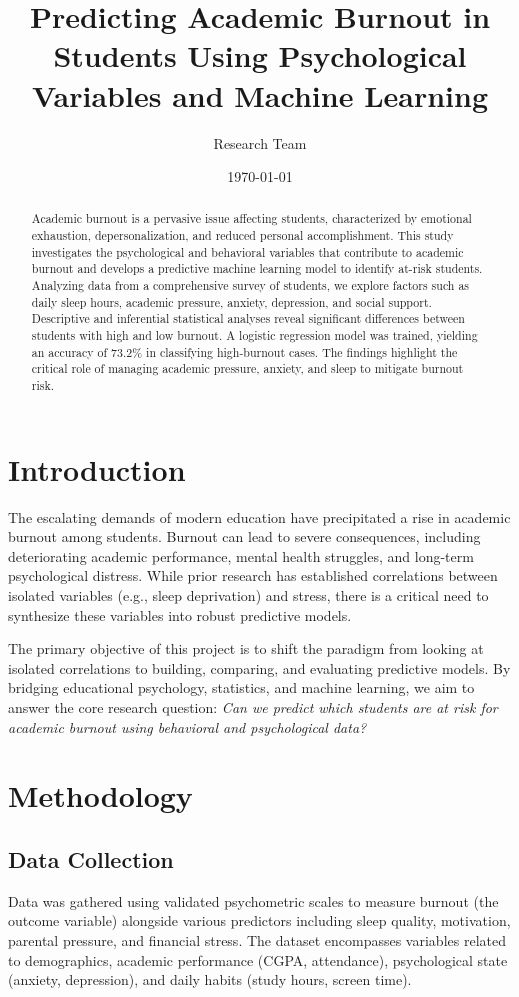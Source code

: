 \documentclass[10pt,twocolumn,letterpaper]{article}
\title{\LARGE \bf Predicting Academic Burnout in Students Using Psychological Variables and Machine Learning}
\author{Research Team}
\date{\today}
\begin{document}
\maketitle

\begin{abstract}
Academic burnout is a pervasive issue affecting students, characterized by emotional exhaustion, depersonalization, and reduced personal accomplishment. This study investigates the psychological and behavioral variables that contribute to academic burnout and develops a predictive machine learning model to identify at-risk students. Analyzing data from a comprehensive survey of students, we explore factors such as daily sleep hours, academic pressure, anxiety, depression, and social support. Descriptive and inferential statistical analyses reveal significant differences between students with high and low burnout. A logistic regression model was trained, yielding an accuracy of 73.2\% in classifying high-burnout cases. The findings highlight the critical role of managing academic pressure, anxiety, and sleep to mitigate burnout risk.
\end{abstract}

\section{Introduction}

The escalating demands of modern education have precipitated a rise in academic burnout among students. Burnout can lead to severe consequences, including deteriorating academic performance, mental health struggles, and long-term psychological distress. While prior research has established correlations between isolated variables (e.g., sleep deprivation) and stress, there is a critical need to synthesize these variables into robust predictive models.

The primary objective of this project is to shift the paradigm from looking at isolated correlations to building, comparing, and evaluating predictive models. By bridging educational psychology, statistics, and machine learning, we aim to answer the core research question: \textit{Can we predict which students are at risk for academic burnout using behavioral and psychological data?}

\section{Methodology}

\subsection{Data Collection}
Data was gathered using validated psychometric scales to measure burnout (the outcome variable) alongside various predictors including sleep quality, motivation, parental pressure, and financial stress. The dataset encompasses variables related to demographics, academic performance (CGPA, attendance), psychological state (anxiety, depression), and daily habits (study hours, screen time).
\end{document}
